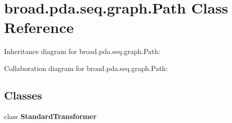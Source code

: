 \hypertarget{classbroad_1_1pda_1_1seq_1_1graph_1_1_path}{\section{broad.\+pda.\+seq.\+graph.\+Path Class Reference}
\label{classbroad_1_1pda_1_1seq_1_1graph_1_1_path}
}


Inheritance diagram for broad.\+pda.\+seq.\+graph.\+Path\+:


Collaboration diagram for broad.\+pda.\+seq.\+graph.\+Path\+:
\subsection*{Classes}
\begin{DoxyCompactItemize}
\item 
class {\bfseries Standard\+Transformer}
\end{DoxyCompactItemize}
